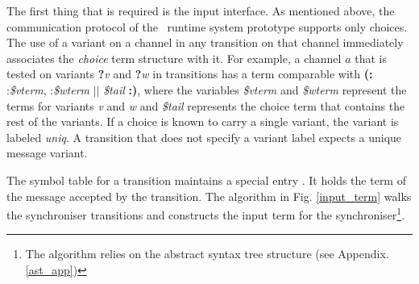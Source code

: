 The first thing that is required is the input interface. As mentioned above, the communication protocol of the \ak\ runtime system prototype supports only choices. The use of a variant on a channel in any transition on that channel immediately associates the \emph{choice} term structure with it. For example, a channel $a$ that is tested on variants \textbf{?}\emph{v} and \textbf{?}\emph{w} in transitions has a term comparable with \textbf{(:} :\emph{\$vterm}, :\emph{\$wterm} $||$ \emph{\$tail} \textbf{:)}, where the variables \emph{\$vterm} and \emph{\$wterm} represent the terms for variants \emph{v} and \emph{w} and \emph{\$tail} represents the choice term that contains the rest of the variants. If a choice is known to carry a single variant, the variant is labeled \emph{uniq}. A transition that does not specify a variant label expects a unique message variant.

The symbol table for a transition maintains a special entry . It holds the term of the message accepted by the transition. The algorithm in Fig. \ref{input_term} walks the synchroniser transitions and constructs the input term for the synchroniser\footnote{The algorithm relies on the abstract syntax tree structure (see Appendix. \ref{ast_app})}.

